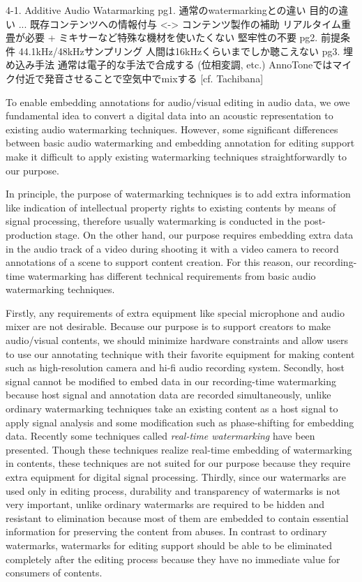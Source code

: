4-1. Additive Audio Watarmarking
	pg1. 通常のwatermarkingとの違い
		目的の違い ... 既存コンテンツへの情報付与 <-> コンテンツ製作の補助
		リアルタイム重畳が必要 + ミキサーなど特殊な機材を使いたくない
		堅牢性の不要
	pg2. 前提条件
		44.1kHz/48kHzサンプリング
		人間は16kHzくらいまでしか聴こえない
	pg3. 埋め込み手法
		通常は電子的な手法で合成する (位相変調, etc.)
		AnnoToneではマイク付近で発音させることで空気中でmixする [cf. Tachibana]
\fi

To enable embedding annotations for audio/visual editing in audio data, we owe fundamental idea to convert a digital data into an acoustic representation to existing audio watermarking techniques.
However, some significant differences between basic audio watermarking and embedding annotation for editing support make it difficult to apply existing watermarking techniques straightforwardly to our purpose.

In principle, the purpose of watermarking techniques is to add extra information like indication of intellectual property rights to existing contents by means of signal processing, therefore usually watermarking is conducted in the post-production stage.
On the other hand, our purpose requires embedding extra data in the audio track of a video during shooting it with a video camera to record annotations of a scene to support content creation.
For this reason, our recording-time watermarking has different technical requirements from basic audio watermarking techniques.

Firstly, any requirements of extra equipment like special microphone and audio mixer are not desirable.
Because our purpose is to support creators to make audio/visual contents, we should minimize hardware constraints and allow users to use our annotating technique with their favorite equipment for making content such as high-resolution camera and hi-fi audio recording system.
Secondly, host signal cannot be modified to embed data in our recording-time watermarking because host signal and annotation data are recorded simultaneously, unlike ordinary watermarking techniques take an existing content as a host signal to apply signal analysis and some modification such as phase-shifting for embedding data. %
Recently some techniques called {\it real-time watermarking} have been presented. Though these techniques realize real-time embedding of watermarking in contents, these techniques are not suited for our purpose because they require extra equipment for digital signal processing.
Thirdly, since our watermarks are used only in editing process, durability and transparency of watermarks is not very important, unlike ordinary watermarks are required to be hidden and resistant to elimination because most of them are embedded to contain essential information for preserving the content from abuses.
In contrast to ordinary watermarks, watermarks for editing support should be able to be eliminated completely after the editing process because they have no immediate value for consumers of contents.

